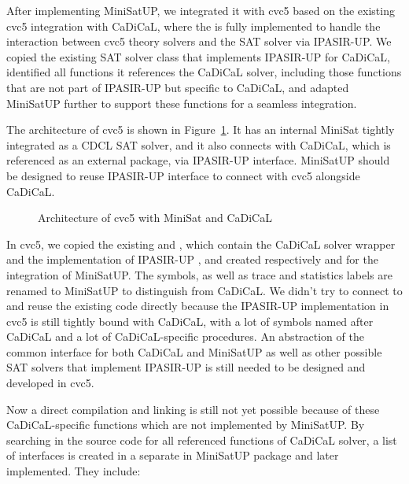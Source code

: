 After implementing MiniSatUP, we integrated it with cvc5 based on the existing cvc5 integration with CaDiCaL, where the  is fully implemented to handle the interaction between cvc5 theory solvers and the SAT solver via IPASIR-UP. We copied the existing SAT solver class that implements IPASIR-UP for CaDiCaL, identified all functions it references the CaDiCaL solver, including those functions that are not part of IPASIR-UP but specific to CaDiCaL, and adapted MiniSatUP further to support these functions for a seamless integration.

The architecture of cvc5 is shown in Figure~\ref{fig:cvc5}. It has an internal MiniSat tightly integrated as a CDCL SAT solver, and it also connects with CaDiCaL, which is referenced as an external package, via IPASIR-UP interface. MiniSatUP should be designed to reuse IPASIR-UP interface to connect with cvc5 alongside CaDiCaL.

\begin{figure}[!htbp]
  \centering
  
  \caption{Architecture of cvc5 with MiniSat and CaDiCaL}
  \label{fig:cvc5}
\end{figure}

In cvc5, we copied the existing  and , which contain the CaDiCaL solver wrapper and the implementation of IPASIR-UP , and created respectively  and  for the integration of MiniSatUP. The symbols, as well as trace and statistics labels are renamed to MiniSatUP to distinguish from CaDiCaL. We didn't try to connect to and reuse the existing code directly because the IPASIR-UP implementation in cvc5 is still tightly bound with CaDiCaL, with a lot of symbols named after CaDiCaL and a lot of CaDiCaL-specific procedures. An abstraction of the common interface for both CaDiCaL and MiniSatUP as well as other possible SAT solvers that implement IPASIR-UP is still needed to be designed and developed in cvc5.

Now a direct compilation and linking is still not yet possible because of these CaDiCaL-specific functions which are not implemented by MiniSatUP. By searching in the source code for all referenced functions of CaDiCaL solver, a list of interfaces is created in a separate  in MiniSatUP package and later implemented. They include:

